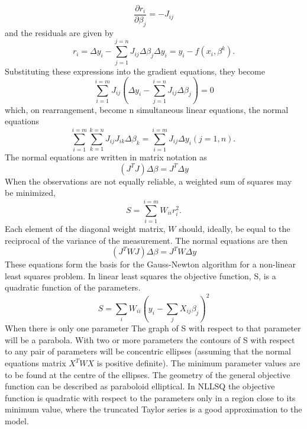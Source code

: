 \documentclass[a4paper,8pt]{report}
\begin{document}
\begin{equation}
\frac{\partial r_i}{\partial \beta_j}=-J_{ij}
\end{equation}
and the residuals are given by
\begin{equation}
    r_i=\Delta y_i- \sum_{j=1}^{j=n} J_{ij}\Delta\beta_j \Delta y_i=y_i- f(x_i, \beta^k).
\end{equation}
Substituting these expressions into the gradient equations, they become
\begin{equation}
    \sum_{i=1}^{i=m}J_{ij} \left( \Delta y_i-\sum_{j=1}^{i=n} J_{ij}\Delta \beta_j \right)=0
\end{equation}
which, on rearrangement, become n simultaneous linear equations, the normal equations
\begin{equation}
    \sum_{i=1}^{i=m}\sum_{k=1}^{k=n} J_{ij}J_{ik}\Delta \beta_k=\sum_{i=1}^{i=m} J_{ij}\Delta y_i (j=1,n).\,
\end{equation}
The normal equations are written in matrix notation as
\begin{equation}
    \left(J^TJ\right)\Delta  \beta=J^T\Delta y
\end{equation}
When the observations are not equally reliable, a weighted sum of squares may be minimized,
\begin{equation}
    S=\sum_{i=1}^{i=m}W_{ii}r_i^2.
\end{equation}
Each element of the diagonal weight matrix, $W$ should, ideally, be equal to the reciprocal of the variance of the measurement. The normal equations are then
\begin{equation}
    \left(J^TWJ\right)\Delta  \beta=J^TW\Delta y
\end{equation}
These equations form the basis for the Gauss-Newton algorithm for a non-linear least squares problem.\newline
In linear least squares the objective function, S, is a quadratic function of the parameters.
\begin{equation}
    S=\sum_i W_{ii} \left(y_i-\sum_jX_{ij}\beta_j \right)^2
\end{equation}
When there is only one parameter The graph of S with respect to that parameter will be a parabola. With two or more parameters the contours of S with respect to any pair of parameters will be concentric ellipses (assuming that the normal equations matrix $X^TWX$ is positive definite). The minimum parameter values are to be found at the centre of the ellipses. The geometry of the general objective function can be described as paraboloid elliptical. In NLLSQ the objective function is quadratic with respect to the parameters only in a region close to its minimum value, where the truncated Taylor series is a good approximation to the model.
\end{document}
